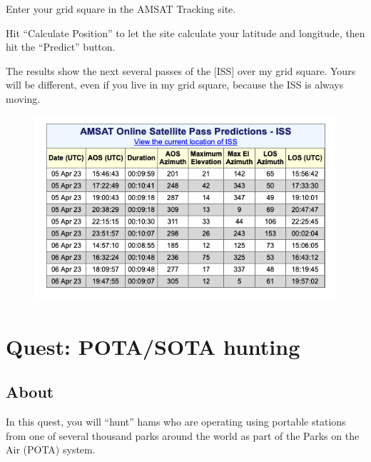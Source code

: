 \documentclass[
  letterpaper,
  DIV=11,
  numbers=noendperiod]{scrreport}
\begin{document}

Enter your grid square in the AMSAT Tracking site.

Hit ``Calculate Position'' to let the site calculate your latitude and
longitude, then hit the ``Predict'' button.

The results show the next several passes of the {[}ISS{]} over my grid
square. Yours will be different, even if you live in my grid square,
because the ISS is always moving.

\begin{figure}

{\centering \includegraphics{include/img/amsat-iss-pred-fn10.png}

}

\end{figure}

\hypertarget{quest_pota}{%
\chapter*{Quest: POTA/SOTA hunting}\label{quest_pota}}


\hypertarget{about-1}{%
\section*{About}\label{about-1}}


In this quest, you will ``hunt'' hams who are operating using portable
stations from one of several thousand parks around the world as part of
the Parks on the Air (POTA) system.
\end{document}
